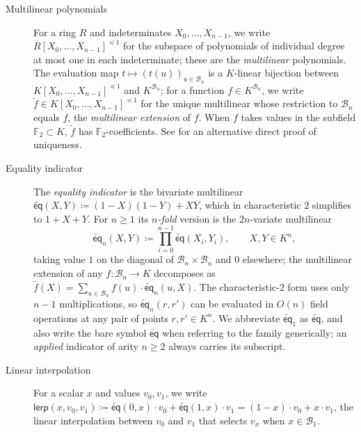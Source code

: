 \documentclass{article}
\theoremstyle{definition}
\newcommand*{\mlin}{{\preceq 1}}
\newcommand*{\mle}{\widetilde}
\newcommand{\eq}{\mathsf{eq}}
\newcommand{\BB}{\mathcal{B}}
\newcommand{\FF}[1]{\mathbb{F}_{#1}}
\begin{document}
\begin{description}
\item[Multilinear polynomials] For a ring $R$ and indeterminates $X_0, \ldots, X_{n - 1}$, we write $R[X_0, \ldots, X_{n - 1}]^\mlin$ for the subspace of polynomials of individual degree at most one in each indeterminate; these are the \emph{multilinear} polynomials. The evaluation map $t \mapsto (t(u))_{u \in \BB_n}$ is a $K$-linear bijection between $K[X_0, \ldots, X_{n - 1}]^\mlin$ and $K^{\BB_n}$; for a function $f \in K^{\BB_n}$, we write $\mle{f} \in K[X_0, \ldots, X_{n - 1}]^\mlin$ for the unique multilinear whose restriction to $\BB_n$ equals $f$, the \emph{multilinear extension} of $f$. When $f$ takes values in the subfield $\FF{2} \subset K$, $\mle{f}$ has $\FF{2}$-coefficients. See \cite[Fact 3.5]{Thaler:2022aa} for an alternative direct proof of uniqueness.

\item[Equality indicator] The \emph{equality indicator} is the bivariate multilinear $\mle{\eq}(X, Y) \coloneqq (1 - X)(1 - Y) + X Y$, which in characteristic $2$ simplifies to $1 + X + Y$. For $n \geq 1$ its \emph{$n$-fold} version is the $2n$-variate multilinear
\[
  \mle{\eq}_n(X, Y) \coloneqq \prod_{i = 0}^{n - 1} \mle{\eq}(X_i, Y_i), \qquad X, Y \in K^n,
\]
taking value $1$ on the diagonal of $\BB_n \times \BB_n$ and $0$ elsewhere; the multilinear extension of any $f \colon \BB_n \to K$ decomposes as $\mle{f}(X) = \sum_{u \in \BB_n} f(u) \cdot \mle{\eq}_n(u, X)$. The characteristic-$2$ form uses only $n - 1$ multiplications, so $\mle{\eq}_n(r, r')$ can be evaluated in $O(n)$ field operations at any pair of points $r, r' \in K^n$. We abbreviate $\mle{\eq}_1$ as $\mle{\eq}$, and also write the bare symbol $\mle{\eq}$ when referring to the family generically; an \emph{applied} indicator of arity $n \geq 2$ always carries its subscript.

\item[Linear interpolation] For a scalar $x$ and values $v_0, v_1$, we write $\textsf{lerp}(x, v_0, v_1) \coloneqq \mle{\eq}(0, x) \cdot v_0 + \mle{\eq}(1, x) \cdot v_1 = (1 - x) \cdot v_0 + x \cdot v_1$, the linear interpolation between $v_0$ and $v_1$ that selects $v_x$ when $x \in \BB_1$.


\end{description}
\end{document}
